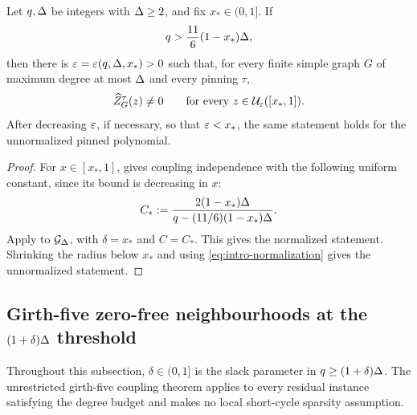 \begin{corollary}
\label{cor:intro-high-temperature}
Let \(q,\Delta\) be integers with \(\Delta\ge2\), and fix \(x_*\in(0,1]\).  If
\[
  q>\frac{11}{6}(1-x_*)\Delta,
\]
then there is \(\varepsilon=\varepsilon(q,\Delta,x_*)>0\) such that, for every finite
simple graph \(G\) of maximum degree at most \(\Delta\) and every pinning
\(\tau\),
\[
  \widehat Z_{G}^{\tau}(z)\ne0
  \qquad\text{for every }z\in\mathcal U_\varepsilon([x_*,1]).
\]
After decreasing \(\varepsilon\), if necessary, so that \(\varepsilon<x_*\), the same
statement holds for the unnormalized pinned polynomial.
\end{corollary}

\begin{proof}
For \(x\in[x_*,1]\),  gives coupling
independence with the following uniform constant, since its bound is
decreasing in \(x\):
\[
  C_*:=
  \frac{2(1-x_*)\Delta}
       {q-(11/6)(1-x_*)\Delta}.
\]
Apply  to \(\mathcal{G}_{\Delta}\), with
\(\delta=x_*\) and \(C=C_*\).  This gives the normalized statement.
Shrinking the radius below \(x_*\) and using
\eqref{eq:intro-normalization} gives the unnormalized statement.
\end{proof}

\subsection{Girth-five zero-free neighbourhoods at the \texorpdfstring{$(1+\delta)\Delta$}{(1+delta)Delta} threshold}
\label{app:girth5-zero-free}

Throughout this subsection, $\delta\in(0,1]$ is the slack parameter in
$q\ge(1+\delta)\Delta$.  The unrestricted girth-five coupling theorem
 applies to every residual instance satisfying the degree budget and makes
no local short-cycle sparsity assumption.

